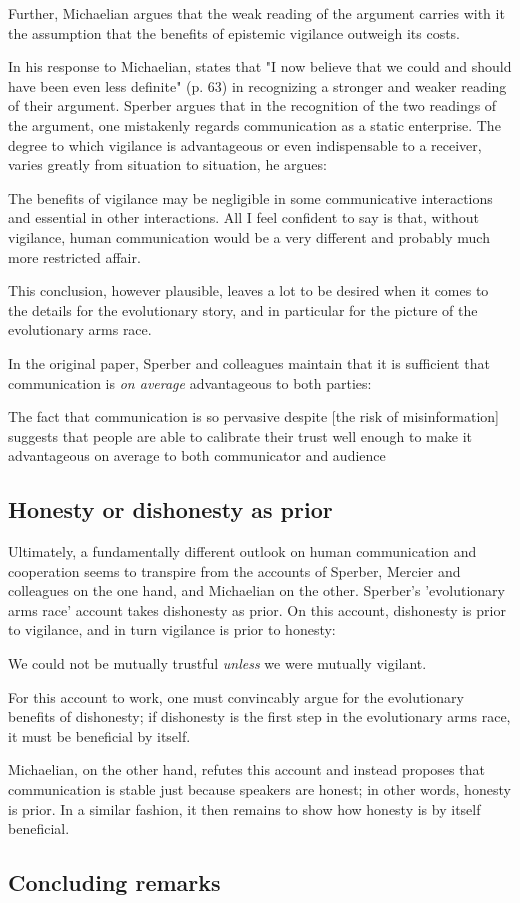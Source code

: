 Further, Michaelian argues that the weak reading of the argument carries with it the assumption that the benefits of epistemic vigilance outweigh its costs.

In his response to Michaelian, \citet{Sperber13} states that "I now believe that we could and should have been even less definite" (p. 63) in recognizing a stronger and weaker reading of their argument. Sperber argues that in the recognition of the two readings of the argument, one mistakenly regards communication as a static enterprise. The degree to which vigilance is advantageous or even indispensable to a receiver, varies greatly from situation to situation, he argues:

\begin{quoting}
    The benefits of vigilance may be negligible in some communicative interactions and essential in other interactions. All I feel confident to say is that, without vigilance, human communication would be a very different and probably much more restricted affair.
    \hfill \citep[p.~63]{Sperber13}
\end{quoting}
This conclusion, however plausible, leaves a lot to be desired when it comes to the details for the evolutionary story, and in particular for the picture of the evolutionary arms race.

In the original \citeyear{Sperber10} paper, Sperber and colleagues maintain that it is sufficient that communication is \emph{on average} advantageous to both parties:
\begin{quoting}
    The fact that communication is so pervasive despite [the risk of misinformation] suggests that people are able to calibrate their trust well enough to make it advantageous on average to both communicator and audience
    \hfill \citep[p.~360]{Sperber10}
\end{quoting}

\subsection{Honesty or dishonesty as prior}

Ultimately, a fundamentally different outlook on human communication and cooperation seems to transpire from the accounts of Sperber, Mercier and colleagues on the one hand, and Michaelian on the other. Sperber's 'evolutionary arms race' account takes dishonesty as prior. On this account, dishonesty is prior to vigilance, and in turn vigilance is prior to honesty:
\begin{quoting}
    We could not be mutually trustful \emph{unless} we were mutually vigilant.
    \hfill \citep[p.~364]{Sperber10}
\end{quoting}
For this account to work, one must convincably argue for the evolutionary benefits of dishonesty; if dishonesty is the first step in the evolutionary arms race, it must be beneficial by itself.

Michaelian, on the other hand, refutes this account and instead proposes that communication is stable just because speakers are honest; in other words, honesty is prior. In a similar fashion, it then remains to show how honesty is by itself beneficial.

\subsection{Concluding remarks}

